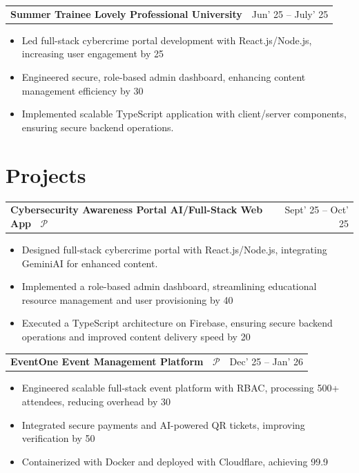 \documentclass[10pt, a4paper]{article}
\makeatletter
\newcommand{\entryrow}[2]{%
  \noindent\begin{tabularx}{\linewidth}{@{}X@{\hspace{4pt}}r@{}}
    {\color{headingblue}\bfseries\fontsize{8.5pt}{10pt}\selectfont #1} &
    {\fontsize{8.5pt}{10pt}\selectfont #2}
  \end{tabularx}\par\vspace{1pt}%
}
\makeatother
\begin{document}
\vspace{5pt}
\entryrow{Summer Trainee \textbar{} Lovely Professional University}{Jun' 25 -- July' 25}
\begin{itemize}
  \item Led full-stack cybercrime portal development with React.js/Node.js, increasing user engagement by 25%
  \item Engineered secure, role-based admin dashboard, enhancing content management efficiency by 30%
  \item Implemented scalable TypeScript application with client/server components, ensuring secure backend operations.
\end{itemize}

\section{Projects}

\entryrow{Cybersecurity Awareness Portal \textbar{} AI/Full-Stack Web App \textbar{}~\href{https://github.com/G4uravXDev}{\textcolor{linknavy}{\ensuremath{\mathcal{P}}}}}{Sept' 25 -- Oct' 25}
\begin{itemize}
  \item Designed full-stack cybercrime portal with React.js/Node.js, integrating GeminiAI for enhanced content.
  \item Implemented a role-based admin dashboard, streamlining educational resource management and user provisioning by 40%
  \item Executed a TypeScript architecture on Firebase, ensuring secure backend operations and improved content delivery speed by 20%
\end{itemize}

\vspace{5pt}
\entryrow{EventOne \textbar{} Event Management Platform \textbar{}~\href{https://github.com/G4uravXDev}{\textcolor{linknavy}{\ensuremath{\mathcal{P}}}}}{Dec' 25 -- Jan' 26}
\begin{itemize}
  \item Engineered scalable full-stack event platform with RBAC, processing 500+ attendees, reducing overhead by 30%
  \item Integrated secure payments and AI-powered QR tickets, improving verification by 50%
  \item Containerized with Docker and deployed with Cloudflare, achieving 99.9%
\end{itemize}
\end{document}
